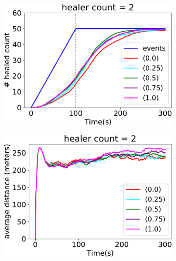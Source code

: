 \begin{figure}[t!]
\centering
\begin{subfigure}[b]{0.32\textwidth}
\centering
\includegraphics[width=\textwidth]{papers/mdpi2020/imgs/healed-2.pdf}
\end{subfigure}
\hfill
%
\begin{subfigure}[b]{0.32\textwidth}
\centering
\includegraphics[width=\textwidth]{papers/mdpi2020/imgs/avg-distance-from-leader-2.pdf}
\end{subfigure}
\hfill
%
\begin{subfigure}[b]{0.32\textwidth}
\centering

\end{subfigure}
\end{figure}
